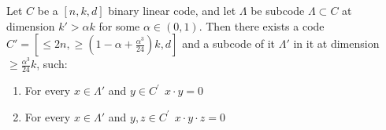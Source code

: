 \ifdefined\MORE
\begin{claim}
  \label{claim:commute}
  Let $C$ be a $[n,k,d]$ binary linear code, and let $\Lambda$ be subcode
  $\Lambda \subset C$ at dimension $k' > \alpha k$ for some $\alpha\in(0,1)$.
  Then there exists a code $C' = [\leq 2n, \geq (1 - \alpha +
  \frac{\alpha^{3}}{24})k, d]$ and a subcode of it $\Lambda' $ in it at
  dimension $\ge \frac{\alpha^{3}}{24}k$, such:
  \begin{enumerate}
      \label{property:prop}
    \item For every $x \in \Lambda'$ and $y \in C^{\prime} \ \ x\cdot y = 0$
    \item For every $x \in \Lambda'$ and $y,z \in C^{\prime} \ \ x \cdot y
      \cdot z =0 $
  \end{enumerate}
\end{claim}
